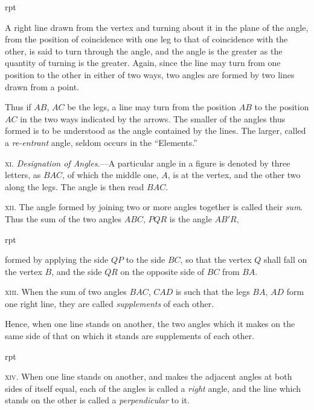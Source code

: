 \documentclass[oneside]{book}
\newcommand\imgflow[3]{
\setcounter{wrapwidth}{#1}
\begin{wrapfigure}[#2]{r}{\value{wrapwidth}pt}
\begin{center}
\vspace{-0.3in}
\end{center}
\end{wrapfigure}
}
\newcommand\imgcent[2]{
\begin{center}
\end{center}
}
\begin{document}
\imgflow{113}{11}{f001}
\begin{footnotesize}
A right line drawn from the vertex and turning about it in the
plane of the angle, from the position of coincidence with one leg
to that of coincidence with the other, is said to turn through the
angle, and the angle is the greater as the quantity of turning is
the greater. Again, since the line may turn from one position to
the other in either of two ways, two angles are formed by two
lines drawn from a point.

Thus if $AB$, $AC$ be the legs, a line
may turn from the position $AB$ to the
position $AC$ in the two ways indicated
by the arrows. The smaller of the angles
thus formed is to be understood as
the angle contained by the lines. The
larger, called a \textit{re-entrant} angle, seldom
occurs in the ``Elements.''
\par\end{footnotesize}

\textsc{xi.} \textit{Designation of Angles.}---A particular angle in a
figure is denoted by three letters, as $BAC$, of which the
middle one, $A$, is at the vertex, and the other two along
the legs. The angle is then read $BAC$.

\imgcent{300}{f002}

\textsc{xii.} The angle formed by joining two or more angles
together is called their \textit{sum}. Thus the sum of the two
angles $ABC$, $PQR$ is the angle $AB'R$,
\imgflow{129}{7}{f003}
formed by applying
the side $QP$ to the side $BC$, so that the vertex $Q$ shall
fall on the vertex $B$, and the
side $QR$ on the opposite side
of $BC$ from $BA$.

\textsc{xiii.} When the sum of two
angles $BAC$, $CAD$ is such that
the legs $BA$, $AD$ form one right
line, they are called \textit{supplements} of each other.

\begin{footnotesize}
Hence, when one line stands on another, the two angles which
it makes on the same side of that on which it stands are supplements
of each other.
\par\end{footnotesize}


\imgflow{121}{7}{f004}
\textsc{xiv}. When one line stands on another, and makes
the adjacent angles at both
sides of itself equal, each of
the angles is called a \textit{right}
angle, and the line which
stands on the other is called
a \textit{perpendicular} to it.
\end{document}
